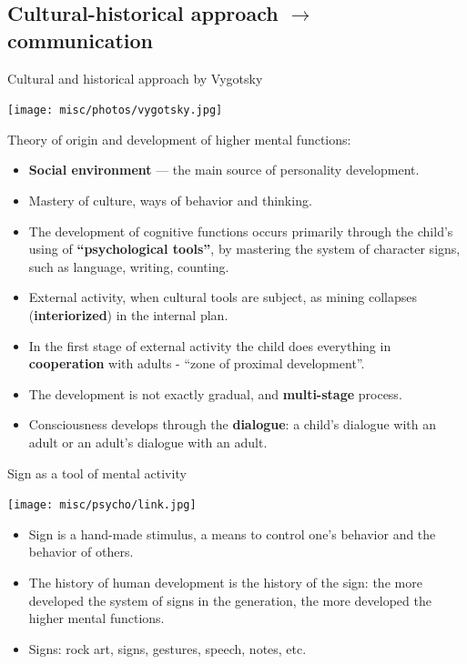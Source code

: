 \documentclass[default]{beamer}
\begin{document}
	\subsection{Cultural-historical approach $\rightarrow$ communication}
	\begin{frame}{Cultural and historical approach by Vygotsky}
		\begin{center}
			\texttt{[image: misc/photos/vygotsky.jpg]}
		\end{center}
		\scriptsize
		Theory of origin and development of higher mental functions:
		\begin{itemize}
			\item \textbf{Social environment} --- the main source of personality development.
			\item Mastery of culture, ways of behavior and thinking.
			\item The development of cognitive functions occurs primarily through the child's using of \textbf {``psychological tools''}, by mastering the system of character signs, such as language, writing, counting.
			\item External activity, when cultural tools are subject, as mining collapses (\textbf{interiorized}) in the internal plan.
			\item In the first stage of external activity the child does everything in \textbf{cooperation} with adults - ``zone of proximal development''.
			\item The development is not exactly gradual, and \textbf{multi-stage} process.
			\item Consciousness develops through the \textbf{dialogue}: a child's dialogue with an adult or an adult's dialogue with an adult.
		\end{itemize}
	\end{frame}

	\begin{frame}{Sign as a tool of mental activity}
		\begin{center}
			\texttt{[image: misc/psycho/link.jpg]}
		\end{center}
		
		\begin{itemize}
			\item Sign is a hand-made stimulus, a means to control one's behavior and the behavior of others.
			\item The history of human development is the history of the sign: the more developed the system of signs in the generation, the more developed the higher mental functions.
			\item Signs: rock art, signs, gestures, speech, notes, etc.
		\end{itemize}
		\par\bigskip
		\nocite{*}
		\printbibliography[keyword={vygotsky}, resetnumbers=true]
	\end{frame}
\end{document}
